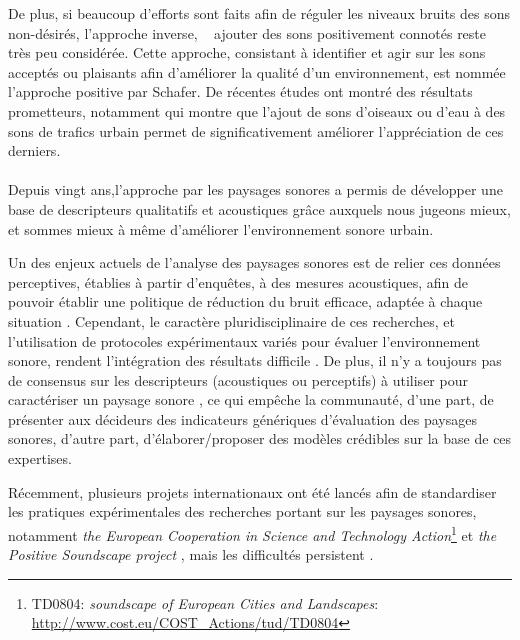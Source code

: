 De plus, si beaucoup d’efforts sont faits afin de réguler les niveaux bruits des sons non-désirés,  l'approche inverse, \ie~ ajouter des sons positivement connotés reste très peu considérée. Cette approche, consistant à identifier et agir sur les sons acceptés ou plaisants afin d'améliorer la qualité d'un environnement, est nommée l'approche positive par Schafer. De récentes études ont montré des résultats prometteurs, notamment \citep{hong2013designing} qui montre que l'ajout de sons d'oiseaux ou d'eau à des sons de trafics urbain permet de significativement améliorer l'appréciation de ces derniers. \\

\\

Depuis vingt ans,l'approche par les paysages sonores a permis de développer une base de descripteurs qualitatifs et acoustiques grâce auxquels nous jugeons mieux, et sommes mieux à même d'améliorer l'environnement sonore urbain.  \citep{kang2006urban,schulte2007soundscape}

Un des enjeux actuels de l'analyse des paysages sonores est de relier ces données perceptives, établies à partir d'enquêtes, à des mesures acoustiques, afin de pouvoir établir une politique de réduction du bruit efficace, adaptée à chaque situation \citep{schulte2013soundscape}.
Cependant, le caractère pluridisciplinaire de ces recherches, et l'utilisation de protocoles expérimentaux variés pour évaluer l'environnement sonore, rendent l’intégration des résultats difficile \citep{davies2013perception}. De plus, il n'y a toujours pas de consensus sur les descripteurs (acoustiques ou perceptifs) à utiliser pour caractériser un paysage sonore \citep{brocolini2012prediction,aletta2016soundscape}, ce qui empêche la communauté, d'une part, de présenter aux décideurs des indicateurs génériques d'évaluation des paysages sonores, d'autre part, d'élaborer/proposer des modèles crédibles sur la base de ces expertises.

Récemment, plusieurs projets internationaux ont été lancés afin de standardiser les pratiques expérimentales des recherches portant sur les paysages sonores, notamment \emph{the European Cooperation in Science and Technology Action}\footnote{TD0804: \emph{soundscape of European Cities and Landscapes}: \url{http://www.cost.eu/COST_Actions/tud/TD0804}} \citep{schulte2010soundscape} et \emph{the Positive Soundscape project} \citep{salford2106,davies2013perception}, mais les difficultés persistent \citep{schulte2013soundscape,ribeiro2013heart}.

